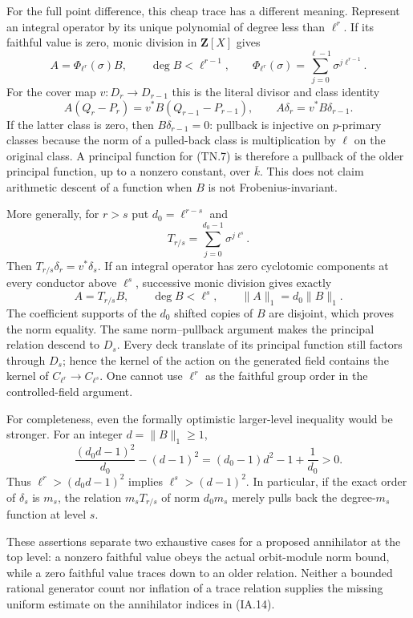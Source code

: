 \documentclass[11pt,a4paper]{article}
\begin{document}
For the full point difference, this cheap trace has a different
meaning. Represent an integral operator by its unique polynomial of
degree less than $\ell^r$. If its faithful value is zero, monic
division in $\mathbf Z[X]$ gives
\[
 A=\Phi_{\ell^r}(\sigma)B,\qquad
 \deg B<\ell^{r-1},\qquad
 \Phi_{\ell^r}(\sigma)=\sum_{j=0}^{\ell-1}
                                      \sigma^{j\ell^{r-1}}.
\tag{TN.6}
\]
For the cover map $v:D_r\to D_{r-1}$ this is the literal divisor
and class identity
\[
 A(Q_r-P_r)=v^*B(Q_{r-1}-P_{r-1}),\qquad
 A\delta_r=v^*B\delta_{r-1}.
\tag{TN.7}
\]
If the latter class is zero, then $B\delta_{r-1}=0$: pullback is
injective on $p$-primary classes because the norm of a pulled-back class
is multiplication by $\ell$ on the original class. A principal function for (TN.7) is
therefore a pullback of the older principal function, up to a
nonzero constant, over $\bar k$. This does not claim arithmetic
descent of a function when $B$ is not Frobenius-invariant.

More generally, for $r>s$ put $d_0=\ell^{r-s}$ and
\[
                 T_{r/s}=\sum_{j=0}^{d_0-1}\sigma^{j\ell^s}.
\tag{TN.8}
\]
Then $T_{r/s}\delta_r=v^*\delta_s$. If an integral operator has
zero cyclotomic components at every conductor above $\ell^s$,
successive monic division gives exactly
\[
             A=T_{r/s}B,\qquad \deg B<\ell^s,
                         \qquad\|A\|_1=d_0\|B\|_1.
\tag{TN.9}
\]
The coefficient supports of the $d_0$ shifted copies of $B$ are
disjoint, which proves the norm equality. The same norm--pullback
argument makes the principal relation descend to $D_s$. Every
deck translate of its principal function still factors through
$D_s$; hence the kernel of the action on the generated field contains the
kernel of $C_{\ell^r}\to C_{\ell^s}$. One cannot use $\ell^r$ as the faithful
group order in the controlled-field argument.

For completeness, even the formally optimistic larger-level
inequality would be stronger. For an integer $d=\|B\|_1\ge1$,
\[
 \frac{(d_0d-1)^2}{d_0}-(d-1)^2
                    =(d_0-1)d^2-1+\frac1{d_0}>0.
\tag{TN.10}
\]
Thus $\ell^r>(d_0d-1)^2$ implies
$\ell^s>(d-1)^2$. In particular, if the exact order of $\delta_s$
is $m_s$, the relation $m_sT_{r/s}$ of norm $d_0m_s$ merely
pulls back the degree-$m_s$ function at level $s$.

These assertions separate two exhaustive cases for a proposed
annihilator at the top level: a nonzero faithful value obeys the
actual orbit-module norm bound, while a zero faithful value traces
down to an older relation. Neither a bounded rational generator
count nor inflation of a trace relation supplies the missing
uniform estimate on the annihilator indices in (IA.14).
\end{document}
